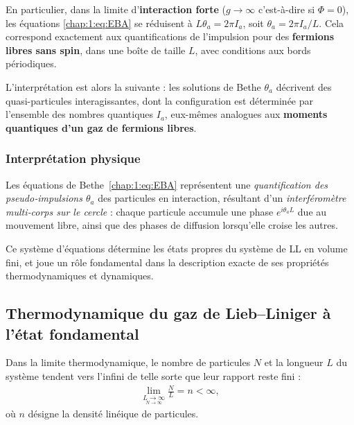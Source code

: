 \medskip

En particulier, dans la limite d’\textbf{interaction forte} (\ie $g \to \infty$ c’est-à-dire si $\Phi = 0$), les équations \eqref{chap:1:eq:EBA} se réduisent à $L \theta_a = 2\pi I_a$, soit $\theta_a = 2\pi I_a / L$. Cela correspond exactement aux quantifications de l'impulsion pour des {\bf fermions libres sans spin}, dans une boîte de taille $L$, avec conditions aux bords périodiques.

\medskip

L’interprétation est alors la suivante : les solutions de Bethe ${ \theta_a }$ décrivent des quasi-particules interagissantes, dont la configuration est déterminée par l’ensemble des nombres quantiques ${ I_a }$, eux-mêmes analogues aux {\bf moments quantiques d’un gaz de fermions libres}. %




\subsubsection{Interprétation physique}

Les équations de Bethe~\eqref{chap:1:eq:EBA} représentent une {\em quantification des pseudo‑impulsions $\theta_a$} des particules en interaction, résultant d’un {\em interféromètre multi‑corps sur le cercle} : chaque particule accumule une phase $e^{i \theta_a L}$ due au mouvement libre, ainsi que des phases de diffusion lorsqu’elle croise les autres.

Ce système d'équations détermine les états propres du système de \gls{LL}  en volume fini, et joue un rôle fondamental dans la description exacte de ses propriétés thermodynamiques et dynamiques.


\subsection{Thermodynamique du gaz de Lieb–Liniger à l'état fondamental}

Dans la limite thermodynamique, le nombre de particules \( N \) et la longueur \( L \) du système tendent vers l'infini de telle sorte que leur rapport reste fini :
\begin{eqnarray*}
	\lim_{\underset{ N \to \infty}{L \to \infty}} \frac{N}{L} = n < \infty,
\end{eqnarray*}
où \( n \) désigne la densité linéique de particules.

